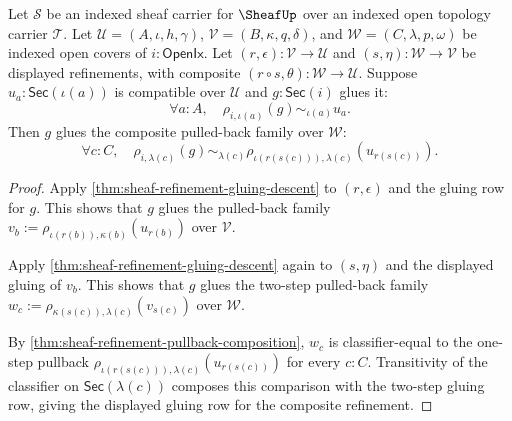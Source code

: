 \begin{theorem}
\label{thm:sheaf-refinement-gluing-composition}
Let $\mathcal{S}$ be an indexed sheaf carrier for $\SheafUp$ over an indexed open topology carrier $\mathcal{T}$. Let $\mathcal{U}=(A,\iota,h,\gamma)$, $\mathcal{V}=(B,\kappa,q,\delta)$, and $\mathcal{W}=(C,\lambda,p,\omega)$ be indexed open covers of $i:\mathsf{OpenIx}$. Let $(r,\epsilon):\mathcal{V}\to\mathcal{U}$ and $(s,\eta):\mathcal{W}\to\mathcal{V}$ be displayed refinements, with composite $(r\circ s,\theta):\mathcal{W}\to\mathcal{U}$. Suppose $u_a:\mathsf{Sec}(\iota(a))$ is compatible over $\mathcal{U}$ and $g:\mathsf{Sec}(i)$ glues it:
$$
\forall a:A,\quad \rho_{i,\iota(a)}(g)\sim_{\iota(a)}u_a.
$$
Then $g$ glues the composite pulled-back family over $\mathcal{W}$:
$$
\forall c:C,\quad
\rho_{i,\lambda(c)}(g)
\sim_{\lambda(c)}
\rho_{\iota(r(s(c))),\lambda(c)}(u_{r(s(c))}).
$$
\end{theorem}
\begin{proof}
Apply \autoref{thm:sheaf-refinement-gluing-descent} to $(r,\epsilon)$ and the gluing row for $g$. This shows that $g$ glues the pulled-back family $v_b:=\rho_{\iota(r(b)),\kappa(b)}(u_{r(b)})$ over $\mathcal{V}$.

Apply \autoref{thm:sheaf-refinement-gluing-descent} again to $(s,\eta)$ and the displayed gluing of $v_b$. This shows that $g$ glues the two-step pulled-back family $w_c:=\rho_{\kappa(s(c)),\lambda(c)}(v_{s(c)})$ over $\mathcal{W}$.

By \autoref{thm:sheaf-refinement-pullback-composition}, $w_c$ is classifier-equal to the one-step pullback $\rho_{\iota(r(s(c))),\lambda(c)}(u_{r(s(c))})$ for every $c:C$. Transitivity of the classifier on $\mathsf{Sec}(\lambda(c))$ composes this comparison with the two-step gluing row, giving the displayed gluing row for the composite refinement.
\end{proof}
